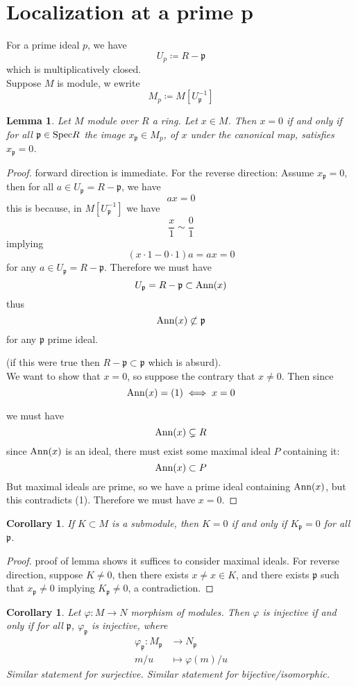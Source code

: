 \documentclass[12pt]{article}
\newcommand{\spec}{\textup{Spec}}
\newcommand{\ann}[1]{\textup{Ann}(#1)}
\newcommand\inv[1]{#1^{-1}}
\newcommand{\mapping}[5]{\begin{align*}
#1\colon #2 &\to #3\\
#4 & \mapsto #5
\end{align*}}
\def\p{\mathfrak{p}}
\newtheorem{corollary}[theorem]{Corollary}
\newtheorem{lemma}[theorem]{Lemma}
\theoremstyle{definition}
\begin{document}
\section*{Localization at a prime p}
For a prime ideal $p$, we have 
\[
U_p \coloneqq R-\p
\]
which is multiplicatively closed.\\
Suppose $M$ is module, w ewrite
\[
M_p \coloneqq M[\inv{U_\p}]
\]
\begin{lemma}
Let $M$ module over $R$ a ring. Let $x\in M$. Then $x=0$ if and only if for all $\p \in \spec{R}$ the image $x_\p \in M_p$, of $x$ under the canonical map, satisfies $x_\p = 0$.
\end{lemma}
\begin{proof}
forward direction is immediate. For the reverse direction: Assume $x_\p = 0$, then for all $a\in U_\p = R-\p$, we have
\[
ax = 0
\]
this is because, in $M[\inv{U_\p}]$ we have
\[
\frac{x}{1} \sim \frac{0}{1}
\]
implying
\[
(x\cdot 1-0\cdot 1)a = ax = 0
\]
for any $a\in U_\p = R-\p$. Therefore we must have 
\[
U_\p = R-\p \subset \ann{x}
\]
thus
\begin{equation}
    \ann{x} \not\subset \p
\end{equation}
for any $\p$ prime ideal.

(if this were true then $R-\p \subset \p$ which is absurd).\\
We want to show that $x=0$, so suppose the contrary that $x\neq 0$. Then since 
\[
\ann{x} = (1) \iff x=0
\]

we must have
\[
\ann{x} \subsetneq R
\]
since $\ann{x}$ is an ideal, there must exist some maximal ideal $P$ containing it:
\[
\ann{x} \subset P
\]
But maximal ideals are prime, so we have a prime ideal containing $\ann{x}$, but this contradicts (1). Therefore we must have $x=0$.
\end{proof}
\begin{corollary}
If $K\subset M$ is a submodule, then $K=0$ if and only if $K_\p = 0$ for all $\p$.
\end{corollary}
\begin{proof}
proof of lemma shows it suffices to consider maximal ideals. For reverse direction, suppose $K\neq 0$, then there exists $x\neq x \in K$, and there exists $\p$ such that $x_\p \neq 0$ implying $K_\p \neq 0$, a contradiction. 
\end{proof}
\begin{corollary}
Let $\varphi: M \rightarrow N$ morphism of modules. Then $\varphi$ is injective if and only if for all $\p$, $\varphi_\p$ is injective, where
\[
\mapping{\varphi_\p}{M_\p}{N_\p}{m/u}{\varphi(m)/u}
\]
Similar statement for surjective. Similar statement for bijective/isomorphic.
\end{corollary}
\end{document}
